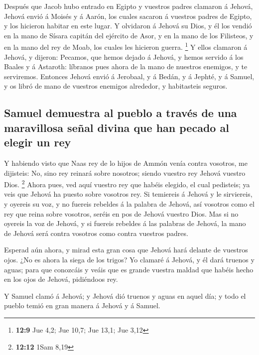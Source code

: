  Después que Jacob hubo entrado en Egipto y vuestros padres
clamaron á Jehová, Jehová envió á Moisés y á Aarón, los cuales sacaron á
vuestros padres de Egipto, y los hicieron habitar en este lugar.
 Y olvidaron á Jehová su Dios, y él los vendió en la mano de
Sísara capitán del ejército de Asor, y en la mano de los Filisteos, y en
la mano del rey de Moab, los cuales les hicieron guerra. \footnote{\textbf{12:9}
  Jue 4,2; Jue 10,7; Jue 13,1; Jue 3,12}  Y ellos clamaron
á Jehová, y dijeron: Pecamos, que hemos dejado á Jehová, y hemos servido
á los Baales y á Astaroth: líbranos pues ahora de la mano de nuestros
enemigos, y te serviremos.  Entonces Jehová envió á
Jerobaal, y á Bedán, y á Jephté, y á Samuel, y os libró de mano de
vuestros enemigos alrededor, y habitasteis seguros.

\hypertarget{samuel-demuestra-al-pueblo-a-travuxe9s-de-una-maravillosa-seuxf1al-divina-que-han-pecado-al-elegir-un-rey}{%
\subsection{Samuel demuestra al pueblo a través de una maravillosa señal
divina que han pecado al elegir un
rey}\label{samuel-demuestra-al-pueblo-a-travuxe9s-de-una-maravillosa-seuxf1al-divina-que-han-pecado-al-elegir-un-rey}}

 Y habiendo visto que Naas rey de lo hijos de Ammón venía
contra vosotros, me dijisteis: No, sino rey reinará sobre nosotros;
siendo vuestro rey Jehová vuestro Dios. \footnote{\textbf{12:12} 1Sam
  8,19}  Ahora pues, ved aquí vuestro rey que habéis
elegido, el cual pedisteis; ya veis que Jehová ha puesto sobre vosotros
rey.  Si temiereis á Jehová y le sirviereis, y oyereis su
voz, y no fuereis rebeldes á la palabra de Jehová, así vosotros como el
rey que reina sobre vosotros, seréis en pos de Jehová vuestro Dios.
 Mas si no oyereis la voz de Jehová, y si fuereis rebeldes
á las palabras de Jehová, la mano de Jehová será contra vosotros como
contra vuestros padres.

 Esperad aún ahora, y mirad esta gran cosa que Jehová hará
delante de vuestros ojos.  ¿No es ahora la siega de los
trigos? Yo clamaré á Jehová, y él dará truenos y aguas; para que
conozcáis y veáis que es grande vuestra maldad que habéis hecho en los
ojos de Jehová, pidiéndoos rey.

 Y Samuel clamó á Jehová; y Jehová dió truenos y aguas en
aquel día; y todo el pueblo temió en gran manera á Jehová y á Samuel.

